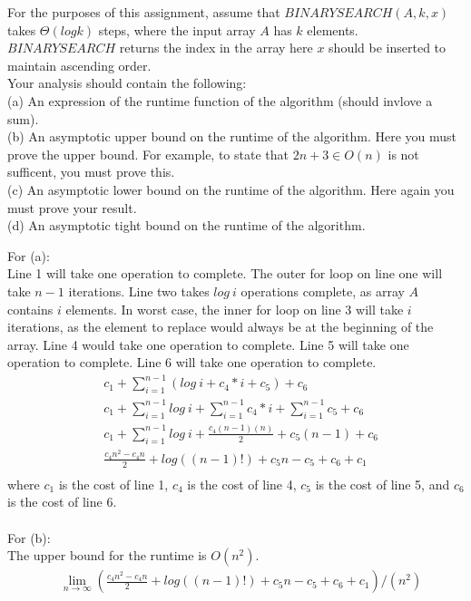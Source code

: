 \documentclass{assignment}
\begin{document}
\begin{problemlist}
\begin{problem}
For the purposes of this assignment, assume that $BINARYSEARCH(A,k,x)$ takes $\Theta(logk)$ steps, where the input array $A$ has $k$ elements. $BINARYSEARCH$ returns the index in the array here $x$ should be inserted to maintain ascending order.\\
Your analysis should contain the following:\\
(a) An expression of the runtime function of the algorithm (should invlove a sum).\\
(b) An asymptotic upper bound on the runtime of the algorithm. Here you must prove the upper bound. For example, to state that $2n+3\in O(n)$ is not sufficent, you must prove this.\\
(c) An asymptotic lower bound on the runtime of the algorithm. Here again you must prove your result.\\
(d) An asymptotic tight bound on the runtime of the algorithm.\\
\end{problem}
\begin{answer}
\clearpage
For (a):\\
Line 1 will take one operation to complete. The outer for loop on line one will take $n-1$ iterations. Line two takes $log~i$ operations complete, as array $A$ contains $i$ elements. In worst case, the inner for loop on line 3 will take $i$ iterations, as the element to replace would always be at the beginning of the array. Line 4 would take one operation to complete. Line 5 will take one operation to complete. Line 6 will take one operation to complete.\\
\begin{align*}
&c_1 + \sum_{i=1}^{n-1} (log~i+c_4*i+c_5) + c_6\\
&c_1 + \sum_{i=1}^{n-1} log~i + \sum_{i=1}^{n-1}c_4*i + \sum_{i=1}^{n-1}c_5 + c_6\\
&c_1 + \sum_{i=1}^{n-1} log~i + \frac{c_4(n-1)(n)}{2} + c_5(n-1) + c_6\\
&\frac{c_4n^2-c_4n}{2} + log((n-1)!) + c_5n-c_5 + c_6 + c_1\\
\end{align*}
where $c_1$ is the cost of line 1, $c_4$ is the cost of line 4, $c_5$ is the cost of line 5, and $c_6$ is the cost of line 6.\\\\
For (b):\\
The upper bound for the runtime is $O(n^2)$.
\begin{align*}
&\lim_{n\rightarrow \infty}(\frac{c_4n^2-c_4n}{2} + log((n-1)!) + c_5n-c_5 + c_6 + c_1)/(n^2)\\

\end{align*}
\end{answer}
\end{problemlist}
\end{document}
